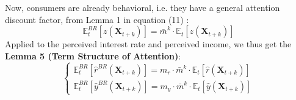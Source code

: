 \documentclass{beamer}
\begin{document}
\begin{frame}
    Now, consumers are already behavioral, i.e. they have a general attention discount factor, from Lemma 1 in equation (11) :
    \begin{equation*}\tag{11}
        \mathbb{E}_{t}^{BR}\left[z\left(\bm{X}_{t+k}\right)\right]=\bar{m}^{k}\cdot\mathbb{E}_{t}\left[z\left(\bm{X}_{t+k}\right)\right]
    \end{equation*}
    Applied to the perceived interest rate and perceived income, we thus get the \textbf{Lemma 5 (Term Structure of Attention)}:
    \begin{equation}\tag{51}
        \begin{cases}
            \mathbb{E}_{t}^{BR}\left[\hat{r}^{BR}(\textbf{X}_{t+k})\right]=m_{r}\cdot\bar{m}^{k}\cdot\mathbb{E}_{t}\left[\hat{r}(\textbf{X}_{t+k})\right] \\
            \mathbb{E}_{t}^{BR}\left[\hat{y}^{BR}(\textbf{X}_{t+k})\right]=m_{y}\cdot\bar{m}^{k}\cdot\mathbb{E}_{t}\left[\hat{y}(\textbf{X}_{t+k})\right]
        \end{cases}
    \end{equation}
\end{frame}
\end{document}

